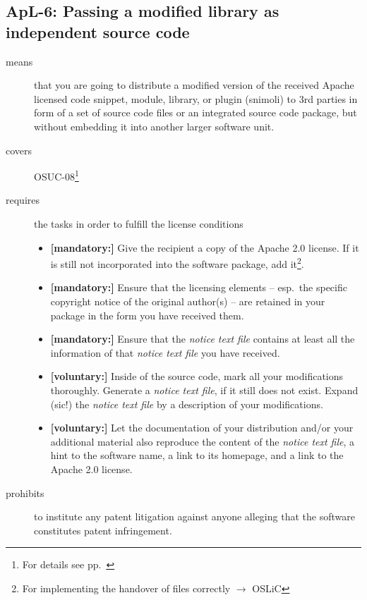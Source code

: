 \subsection{ApL-6: Passing a modified library as independent source code}
\label{OSUC-08-Apache20}

\begin{description}
\item[means] that you are going to distribute a modified version of the received
Apache licensed code snippet, module, library, or plugin (snimoli) to 3rd
parties in form of a set of source code files or an integrated source code
package, but without embedding it into another larger software unit.
\item[covers] OSUC-08\footnote{For details see pp.\ \pageref{OSUC-08-DEF}}
\item[requires] the tasks in order to fulfill the license conditions
\begin{itemize}
  
  \item \textbf{[mandatory:]} Give the recipient a copy of the Apache 2.0
  license. If it is still not incorporated into the software package, add
  it\footnote{For implementing the handover of files correctly $\rightarrow$
  OSLiC \pageref{DistributingFilesHint}}.

  \item \textbf{[mandatory:]} Ensure that the licensing elements -- esp.\ the
  specific copyright notice of the original author(s) -- are retained in your
  package in the form you have received them.
  
  \item \textbf{[mandatory:]} Ensure that the \emph{notice text file} contains at least
  all the information of that \emph{notice text file} you have received.
 
  \item \textbf{[voluntary:]} Inside of the source code, mark all your
  modifications thoroughly. Generate a \emph{notice text file}, if it still does not
  exist. Expand (sic!) the \emph{notice text file} by a description of your
  modifications.
   
  \item \textbf{[voluntary:]} Let the documentation of your distribution and/or
  your additional material also reproduce the content of the \emph{notice text
  file}, a hint to the software name, a link to its homepage, and a link to the
  Apache 2.0 license.

\end{itemize}

\item[prohibits] to institute any patent litigation against anyone alleging that
the software constitutes patent infringement.

\end{description}


